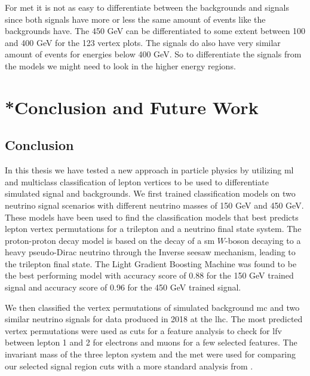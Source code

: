 \documentclass[a4paper, american, 12pt]{report}
\begin{document}
	For \acrshort{met} it is not as easy to differentiate between the backgrounds and signals since both signals have more or less the same amount of events like the backgrounds have. The 450 GeV can be differentiated to some extent between 100 and 400 GeV for the 123 vertex plots. The signals do also have very similar amount of events for energies below 400 GeV. So to differentiate the signals from the models we might need to look in the higher energy regions.
	
	

	\chapter{*Conclusion and Future Work}
	\label{chap:Conclusion}	
	
	\section{Conclusion}
	\label{sect:Conclusion-Conclusion}
	In this thesis we have tested a new approach in particle physics by utilizing \acrshort{ml} and multiclass classification of lepton vertices to be used to differentiate simulated signal and backgrounds. We first trained classification models on two neutrino signal scenarios with different neutrino masses of 150 GeV and 450 GeV. These models have been used to find the classification models that best predicts lepton vertex permutations for a trilepton and a neutrino final state system. The proton-proton decay model is based on the decay of a \acrshort{sm} $W$-boson decaying to a heavy pseudo-Dirac neutrino through the Inverse seesaw mechanism, leading to the trilepton final state. The Light Gradient Boosting Machine was found to be the best performing model with accuracy score of 0.88 for the 150 GeV trained signal and accuracy score of 0.96 for the 450 GeV trained signal.
	
	We then classified the vertex permutations of simulated background \acrshort{mc} and two similar neutrino signals for data produced in 2018 at the \acrshort{lhc}. The most predicted vertex permutations were used as cuts for a feature analysis to check for \acrshort{lfv} between lepton 1 and 2 for electrons and muons for a few selected features. The invariant mass of the three lepton system and the \acrshort{met} were used for comparing our selected signal region cuts with a more standard analysis from \citet{inverseseesaw}. 
	
\end{document}
